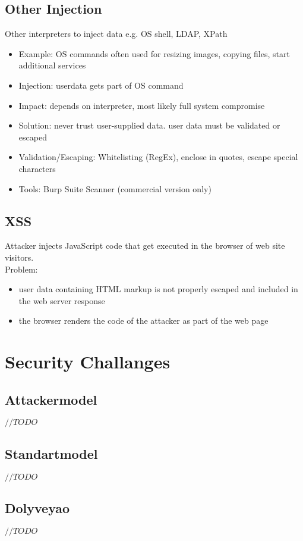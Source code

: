 \documentclass[a4paper, 12pt]{article}
\begin{document}
\subsection{Other Injection}
Other interpreters to inject data e.g. OS shell, LDAP, XPath \\
\begin{itemize}
\item Example: OS commands often used for resizing images, copying files, start additional services
\item Injection: userdata gets part of OS command
\item Impact: depends on interpreter, most likely full system compromise
\item Solution: never trust user-supplied data. user data must be validated or escaped
\item Validation/Escaping: Whitelisting (RegEx), enclose in quotes, escape special characters
\item Tools: Burp Suite Scanner (commercial version only)
\end{itemize}

\subsection{XSS}
Attacker injects JavaScript code that get executed in the browser of web site visitors.\\

Problem:
\begin{itemize}
\item user data containing HTML markup is not properly escaped and included in the web server response
\item the browser renders the code of the attacker as part of the web page
\end{itemize}

\section{Security Challanges}
\subsection{Attackermodel}
$ //TODO $
\subsection{Standartmodel}
$ //TODO $
\subsection{Dolyveyao}
$ //TODO $
\end{document}
